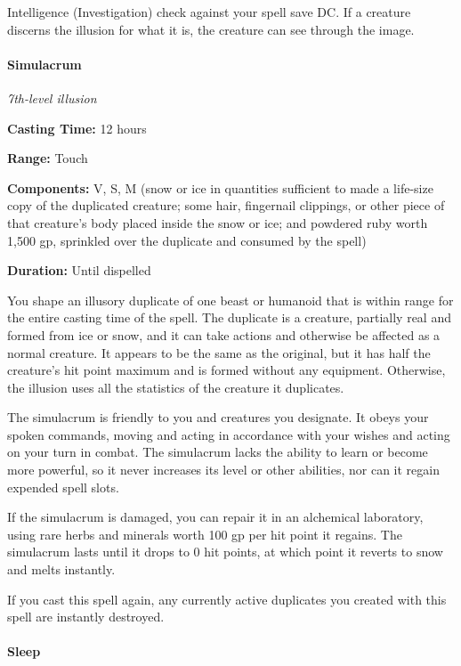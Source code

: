 \documentclass[
]{article}
\begin{document}
Intelligence (Investigation) check against your spell save DC. If a
creature discerns the illusion for what it is, the creature can see
through the image.

\hypertarget{simulacrum}{%
\paragraph{Simulacrum}\label{simulacrum}}

\emph{7th-level illusion}

\textbf{Casting Time:} 12 hours

\textbf{Range:} Touch

\textbf{Components:} V, S, M (snow or ice in quantities sufficient to
made a life-size copy of the duplicated creature; some hair, fingernail
clippings, or other piece of that creature's body placed inside the snow
or ice; and powdered ruby worth 1,500 gp, sprinkled over the duplicate
and consumed by the spell)

\textbf{Duration:} Until dispelled

You shape an illusory duplicate of one beast or humanoid that is within
range for the entire casting time of the spell. The duplicate is a
creature, partially real and formed from ice or snow, and it can take
actions and otherwise be affected as a normal creature. It appears to be
the same as the original, but it has half the creature's hit point
maximum and is formed without any equipment. Otherwise, the illusion
uses all the statistics of the creature it duplicates.

The simulacrum is friendly to you and creatures you designate. It obeys
your spoken commands, moving and acting in accordance with your wishes
and acting on your turn in combat. The simulacrum lacks the ability to
learn or become more powerful, so it never increases its level or other
abilities, nor can it regain expended spell slots.

If the simulacrum is damaged, you can repair it in an alchemical
laboratory, using rare herbs and minerals worth 100 gp per hit point it
regains. The simulacrum lasts until it drops to 0 hit points, at which
point it reverts to snow and melts instantly.

If you cast this spell again, any currently active duplicates you
created with this spell are instantly destroyed.

\hypertarget{sleep}{%
\paragraph{Sleep}\label{sleep}}
\end{document}
